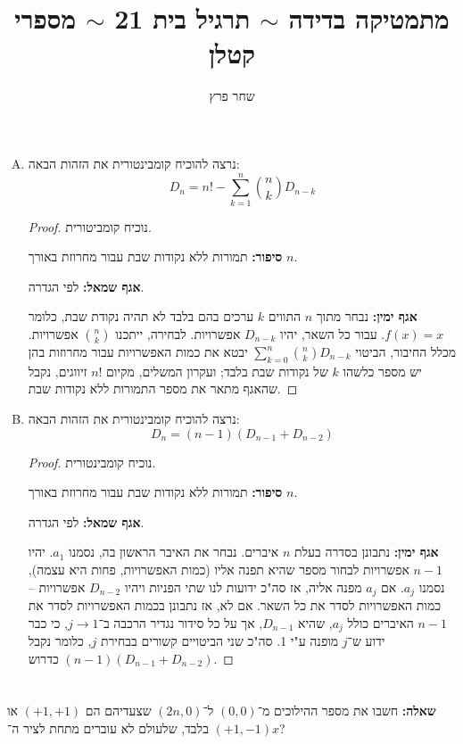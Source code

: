 \documentclass[]{article}
\author{שחר פרץ}
\title{מתמטיקה בדידה $\sim$ תרגיל בית 21 $\sim$ מספרי קטלן}
\newcommand\she   {\selectlanguage{hebrew}}
\newcommand\sumnk     {\sum_{k = 0}^{n}}
\newcommand\bink      {\binom{n}{k}}
\begin{document}
	\maketitle
	\she
	\section{} %
	\begin{enumerate}[(A)]
		\item נרצה להוכיח קומבינטורית את הזהות הבאה: 
		\[D_n = n! - \sum_{k = 1}^{n} \bink D_{n - k}\]
		\begin{proof}נוכיח קומביטורית. 

			\textbf{סיפור: }תמורות ללא נקודות שבת עבור מחרוזת באורך $n$. 
			
			\textbf{אגף שמאל: }לפי הגדרה.
			
			\textbf{אגף ימין: }נבחר מתוך $n$ התווים $k$ ערכים בהם בלבד לא תהיה נקודת שבת, כלומר $f(x) = x$. עבור כל השאר, יהיו $D_{n - k}$ אפשרויות. לבחירה, ייתכנו $\binom{n}{k}$ אפשרויות. מכלל החיבור, הביטוי $\sumnk \bink D_{n - k}$ יבטא את כמות האפשרויות עבור מחרוזות בהן יש מספר כלשהו $k$ של נקודות שבת בלבד; ועקרון המשלים, מקיום $n!$ זיווגים, נקבל שהאגף מתאר את מספר התמורות ללא נקודות שבת. 
		\end{proof}
		
		\item נרצה להוכיח קומבינטורית את הזהות הבאה: 
		\[ D_n = (n - 1)(D_{n - 1} + D_{n - 2}) \]
		\begin{proof}נוכיח קומבינטורית. 
			
			\textbf{סיפור: }תמורות ללא נקודות שבת עבור מחרוזת באורך $n$. 
			
			\textbf{אגף שמאל: }לפי הגדרה.
			
			\textbf{אגף ימין: }נתבונן בסדרה בעלת $n$ איברים. נבחר את האיבר הראשון בה, נסמנו $a_1$. יהיו $n - 1$ אפשרויות לבחור מספר שהיא תפנה אליו (כמות האפשרויות, פחות היא עצמה), נסמנו $a_j$. אם $a_j$ מפנה אליה, אז סה"כ ידועות לנו שתי הפניות ויהיו $D_{n - 2}$ אפשרויות – כמות האפשרויות לסדר את כל השאר. אם לא, אז נתבונן בכמות האפשרויות לסדר את $n - 1$ האיברים כולל $a_j$, שהיא $D_{n - 1}$, אך על כל סידור נגדיר הרכבה ב־$j \to 1$, כי כבר ידוע ש־$j$ מופנה ע"י 1. סה"כ שני הביטויים קשורים בבחירת $j$, כלומר נקבל $(n - 1)(D_{n - 1} + D_{n - 2})$ כדרוש. 
		\end{proof}
	\end{enumerate}
	
	\section{} %
	\textbf{שאלה: }חשבו את מספר ההילוכים מ־$(0, 0)$ ל־$(2n, 0)$ שצעדיהם הם $(+1, +1)$ או $(+1, - 1)$ בלבד, שלעולם לא עוברים מתחת לציר ה־$x$?
	
\end{document}
